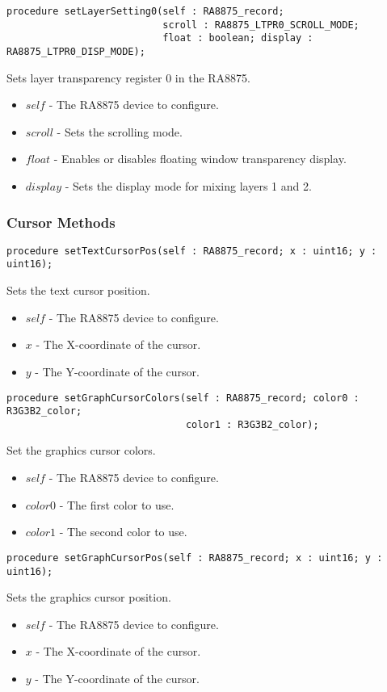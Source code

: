 \documentclass[10pt, openany]{book}
\begin{document}
\begin{lstlisting}
procedure setLayerSetting0(self : RA8875_record;
                           scroll : RA8875_LTPR0_SCROLL_MODE;
                           float : boolean; display : RA8875_LTPR0_DISP_MODE);
\end{lstlisting}
Sets layer transparency register 0 in the RA8875.
\begin{itemize}
  \item $self$ - The RA8875 device to configure.
  \item $scroll$ - Sets the scrolling mode.
  \item $float$ - Enables or disables floating window transparency display.
  \item $display$ - Sets the display mode for mixing layers 1 and 2.
\end{itemize}

\subsubsection{Cursor Methods}
\begin{lstlisting}
procedure setTextCursorPos(self : RA8875_record; x : uint16; y : uint16);
\end{lstlisting}
Sets the text cursor position.
\begin{itemize}
  \item $self$ - The RA8875 device to configure.
  \item $x$ - The X-coordinate of the cursor.
  \item $y$ - The Y-coordinate of the cursor.
\end{itemize}

\begin{lstlisting}
procedure setGraphCursorColors(self : RA8875_record; color0 : R3G3B2_color;
                               color1 : R3G3B2_color);
\end{lstlisting}
Set the graphics cursor colors.
\begin{itemize}
  \item $self$ - The RA8875 device to configure.
  \item $color0$ - The first color to use.
  \item $color1$ - The second color to use.
\end{itemize}

\begin{lstlisting}
procedure setGraphCursorPos(self : RA8875_record; x : uint16; y : uint16);
\end{lstlisting}
Sets the graphics cursor position.
\begin{itemize}
  \item $self$ - The RA8875 device to configure.
  \item $x$ - The X-coordinate of the cursor.
  \item $y$ - The Y-coordinate of the cursor.
\end{itemize}
\end{document}
